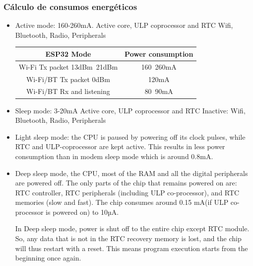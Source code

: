 \documentclass[a4paper ,12pt, onecolumn]{article}
\begin{document}
        \subsubsection{Cálculo de consumos energéticos}
            \begin{itemize}
                \item  Active mode: 160-260mA.  Active core, ULP coprocessor and RTC
                Wifi, Bluetooth, Radio, Peripherals
                \begin{center}
                    \begin{tabular}{||c | c ||} 
                    \hline
                    ESP32 Mode & Power consumption  \\ [0.5ex] 
                    \hline\hline
                    Wi-Fi Tx packet 13dBm~21dBm & 160~260mA  \\ 
                    \hline
                    Wi-Fi/BT Tx packet 0dBm	 & 120mA  \\
                    \hline
                    Wi-Fi/BT Rx and listening & 80~90mA  \\
                    \hline
                \end{tabular}
                \end{center}
                \item  Sleep mode: 3-20mA Active core, ULP coprocessor and RTC
                Inactive: Wifi, Bluetooth, Radio, Peripherals
                \item  Light sleep mode: the CPU is paused by powering off its clock 
                pulses, while RTC and ULP-coprocessor are kept active. This results in 
                less power consumption than in modem sleep mode which is around 0.8mA.
            
                \item Deep sleep mode, the CPU, most of the RAM and all the digital 
                peripherals are powered off. The only parts of the chip that remains 
                powered on are: RTC controller, RTC peripherals (including ULP 
                co-processor), and RTC memories (slow and fast).
                The chip consumes around 0.15 mA(if ULP co-processor is powered on) to 10µA.
            
                In Deep sleep mode, power is shut off to the entire chip except RTC module. So, any data that is not in the RTC recovery memory is lost, and the chip will thus restart with a reset. This means program execution starts from the beginning once again.
            

\end{itemize}
\end{document}
